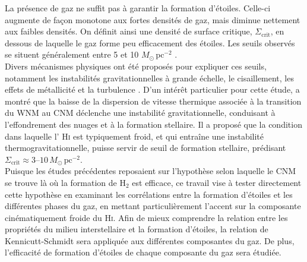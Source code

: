 La présence de gaz ne suffit pas à garantir la formation d'étoiles. Celle-ci augmente de façon monotone aux fortes densités de gaz, mais diminue nettement aux faibles densités. On définit ainsi une densité de surface critique, $\Sigma_{\mathrm{crit}}$, en dessous de laquelle le gaz forme peu efficacement des étoiles. Les seuils observés se situent généralement entre 5 et 10 $M_\odot\,\mathrm{pc}^{-2}$ \citep{Kennicutt1998, Martin2001}.\\\indent
Divers mécanismes physiques ont été proposés pour expliquer ces seuils, notamment les instabilités gravitationnelles à grande échelle, le cisaillement, les effets de métallicité et la turbulence \citep{Leroy2008, Sternberg2014, Federrath2015}. D'un intérêt particulier pour cette étude, \citet{Schaye2004} a montré que la baisse de la dispersion de vitesse thermique associée à la transition du WNM au CNM déclenche une instabilité gravitationnelle, conduisant à l'effondrement des nuages et à la formation stellaire. Il a proposé que la condition dans laquelle l' \textrm{H\textsc{i}} est typiquement froid, et qui entraîne une instabilité thermogravitationnelle, puisse servir de seuil de formation stellaire, prédisant $\Sigma_{\mathrm{crit}} \approx 3$--$10\,M_\odot\,\mathrm{pc}^{-2}$.\\[2em]  \indent
Puisque les études précédentes reposaient sur l'hypothèse selon laquelle le CNM se trouve là où la formation de H$_2$ est efficace, ce travail vise à tester directement cette hypothèse en examinant les corrélations entre la formation d'étoiles et les différentes phases du gaz, en mettant particulièrement l'accent sur la composante cinématiquement froide du \textrm{H\textsc{i}}. Afin de mieux comprendre la relation entre les propriétés du milieu interstellaire et la formation d'étoiles, la relation de Kennicutt-Schmidt sera appliquée aux différentes composantes du gaz. De plus, l'efficacité de formation d'étoiles de chaque composante du gaz sera étudiée.